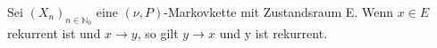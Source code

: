\label{rekkurent und x -> y so gilt y -> x und y rekurrent}
Sei $(X_{n})_{n \in \mathbb{N}_{0}}$ eine $(\nu,P)$-Markovkette mit Zustandsraum E. Wenn $x \in E$ rekurrent ist und $x \rightarrow y$, so gilt $y \rightarrow x$ und y ist rekurrent.  